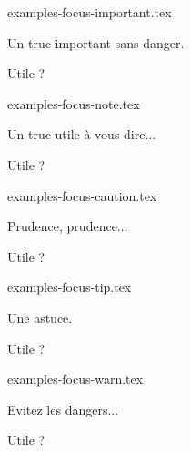 \begin{filecontents*}[overwrite]{examples-focus-important.tex}
\begin{tdocimp}
    Un truc important sans danger.
\end{tdocimp}

\begin{tdocimp}
    Utile ?
\end{tdocimp}
\end{filecontents*}


\begin{filecontents*}[overwrite]{examples-focus-note.tex}
\begin{tdocnote}
    Un truc utile à vous dire...
\end{tdocnote}

\begin{tdocnote}
    Utile ?
\end{tdocnote}
\end{filecontents*}


\begin{filecontents*}[overwrite]{examples-focus-caution.tex}
\begin{tdoccaution}
    Prudence, prudence...
\end{tdoccaution}

\begin{tdoccaution}
    Utile ?
\end{tdoccaution}
\end{filecontents*}


\begin{filecontents*}[overwrite]{examples-focus-tip.tex}
\begin{tdoctip}
    Une astuce.
\end{tdoctip}

\begin{tdoctip}
    Utile ?
\end{tdoctip}
\end{filecontents*}


\begin{filecontents*}[overwrite]{examples-focus-warn.tex}
\begin{tdocwarn}
    Evitez les dangers...
\end{tdocwarn}

\begin{tdocwarn}
    Utile ?
\end{tdocwarn}
\end{filecontents*}


